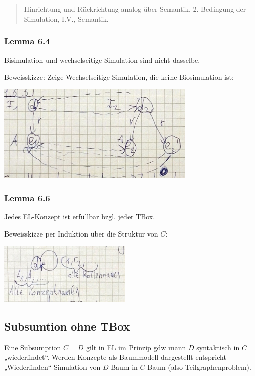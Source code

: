 \begin{quote}
Hinrichtung und Rückrichtung analog über Semantik, 2. Bedingung der
Simulation, I.V., Semantik.
\end{quote}

\subsubsection{Lemma 6.4}\label{lemma-6.4}

Bisimulation und wechselseitige Simulation sind nicht dasselbe.

Beweisskizze: Zeige Wechselseitige Simulation, die keine Biosimulation
ist:

\includegraphics[width=3.71910in,height=1.83200in]{media/image1.png}

\subsubsection{Lemma 6.6}\label{lemma-6.6}

Jedes EL-Konzept ist erfüllbar bzgl. jeder TBox.

Beweisskizze per Induktion über die Struktur von $C$:

\includegraphics[width=2.50460in,height=1.15200in]{media/image2.png}

\subsection{Subsumtion ohne TBox}\label{subsumtion-ohne-tbox}

Eine Subsumption $C \sqsubseteq D$ gilt in EL im Prinzip gdw mann
$D$ syntaktisch in $C$ „wiederfindet``. Werden Konzepte als
Baummodell dargestellt entspricht „Wiederfinden`` Simulation von
$D$-Baum in $C$-Baum (also Teilgraphenproblem).

